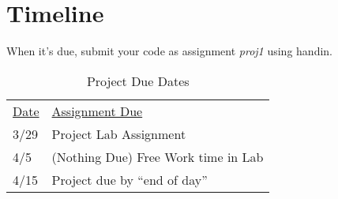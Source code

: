 \documentclass[]{tufte-handout}
\begin{document}
\newpage

\section{Timeline}

When it's due, submit your code as assignment \textit{proj1} using handin.
\begin{table}[!htpb]
  \begin{tabular}{ll}
    \underline{Date} & \underline{Assignment Due} \\
      3/29 & Project Lab Assignment \\
      4/5  & (Nothing Due) Free Work time in Lab \\
      4/15 & Project due by ``end of day''
  \end{tabular}
  \caption{Project Due Dates}
\label{tab:duedates}
\end{table}
\end{document}
